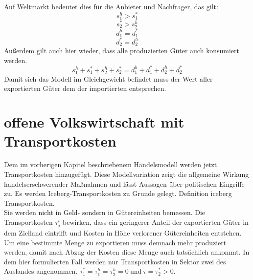 Auf Weltmarkt bedeutet dies f{\"u}r die Anbieter und Nachfrager, das gilt: 
\begin{displaymath}s_1^h>s_1^*\end{displaymath}
\begin{displaymath}s_2^*>s_2^h\end{displaymath}
\begin{displaymath}d_1^h=d_1^*\end{displaymath}
\begin{displaymath}d_2^*=d_2^h\end{displaymath}
Au{\ss}erdem gilt auch hier wieder, dass alle produzierten G{\"u}ter auch konsumiert werden. 
\begin{equation}s_1^h+s_1^*+s_2^h+s_2^*=d_1^h+d_1^*+d_2^h+d_2^*\end{equation}
Damit sich das Modell im Gleichgewicht befindet muss der Wert aller exportierten G{\"u}ter dem der importierten entsprechen.

\section{offene Volkswirtschaft mit Transportkosten}
Dem im vorherigen Kapitel beschriebenem Handelsmodell werden jetzt Transportkosten hinzugef{\"u}gt. Diese Modellvariation zeigt die allgemeine Wirkung handelserschwerender Ma{\ss}nahmen und l{\"a}sst Aussagen {\"u}ber politischen Eingriffe zu.\newline 
Es werden Iceberg-Transportkosten zu Grunde gelegt.\newline 
\textcolor[rgb]{1,0,0}{Definition iceberg Transportkosten.}\\
Sie werden nicht in Geld- sondern in G{\"u}tereinheiten bemessen. Die Transportkosten $\tau_j^i$ bewirken, dass ein geringerer Anteil der exportierten G{\"u}ter in dem Zielland eintrifft und Kosten in H{\"o}he {\dq}verlorener{\dq} G{\"u}tereinheiten entstehen. Um eine bestimmte Menge zu exportieren muss demnach mehr produziert werden, damit nach Abzug der Kosten diese Menge auch tats{\"a}chlich ankommt. In dem hier formulierten Fall werden nur Transportkosten in Sektor zwei des Auslandes angenommen. $\tau_1^* = \tau_1^h = \tau_2^h = 0 ~\text{und} ~\tau=\tau_2^*>0$.

